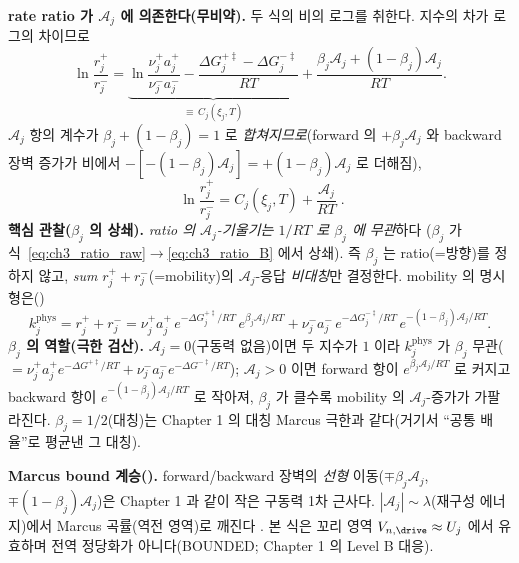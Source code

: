 \textbf{rate ratio 가 $\mathcal A_j$ 에 의존한다(무비약).} 두 식의 비의 로그를 취한다. 지수의 차가 로그의 차이므로
\begin{equation}
\ln\frac{r_j^+}{r_j^-}=\underbrace{\ln\frac{\nu_j^+a_j^+}{\nu_j^-a_j^-}-\frac{\Delta G_j^{+\ddagger}-\Delta G_j^{-\ddagger}}{RT}}_{\equiv\,C_j(\xi_j,T)}
+\frac{\beta_j\mathcal A_j+(1-\beta_j)\mathcal A_j}{RT}.
\label{eq:ch3_ratio_raw}
\end{equation}
$\mathcal A_j$ 항의 계수가 $\beta_j+(1-\beta_j)=1$ 로 \emph{합쳐지므로}(forward 의 $+\beta_j\mathcal A_j$ 와
backward 장벽 증가가 비에서 $-[-(1-\beta_j)\mathcal A_j]=+(1-\beta_j)\mathcal A_j$ 로 더해짐),
\begin{equation}
\boxed{\;\ln\frac{r_j^+}{r_j^-}=C_j(\xi_j,T)+\frac{\mathcal A_j}{RT}\;.}
\label{eq:ch3_ratio_B}
\end{equation}
\textbf{핵심 관찰($\beta_j$ 의 상쇄).} \emph{ratio 의 $\mathcal A_j$-기울기는 $1/RT$ 로 $\beta_j$ 에 무관}하다
($\beta_j$ 가 식~\eqref{eq:ch3_ratio_raw}$\to$\eqref{eq:ch3_ratio_B} 에서 상쇄). 즉 $\beta_j$ 는 ratio(=방향)를
정하지 않고, \emph{sum} $r_j^++r_j^-$(=mobility)의 $\mathcal A_j$-응답 \emph{비대칭}만 결정한다. mobility 의
명시형은()
\begin{equation}
k_j^{\mathrm{phys}}=r_j^++r_j^-
=\nu_j^+a_j^+\,e^{-\Delta G_j^{+\ddagger}/RT}\,e^{\beta_j\mathcal A_j/RT}
+\nu_j^-a_j^-\,e^{-\Delta G_j^{-\ddagger}/RT}\,e^{-(1-\beta_j)\mathcal A_j/RT}.
\label{eq:ch3_ksum}
\end{equation}
\textbf{$\beta_j$ 의 역할(극한 검산).} $\mathcal A_j=0$(구동력 없음)이면 두 지수가 $1$ 이라 $k_j^{\mathrm{phys}}$ 가
$\beta_j$ 무관($=\nu_j^+a_j^+e^{-\Delta G^{+\ddagger}/RT}+\nu_j^-a_j^-e^{-\Delta G^{-\ddagger}/RT}$); $\mathcal A_j>0$
이면 forward 항이 $e^{\beta_j\mathcal A_j/RT}$ 로 커지고 backward 항이 $e^{-(1-\beta_j)\mathcal A_j/RT}$ 로 작아져,
$\beta_j$ 가 클수록 mobility 의 $\mathcal A_j$-증가가 가팔라진다. $\beta_j=1/2$(대칭)는 Chapter 1 의 대칭 Marcus
극한과 같다(거기서 ``공통 배율''로 평균낸 그 대칭).
\begin{boundbox}
\textbf{Marcus bound 계승().} forward/backward 장벽의 \emph{선형} 이동($\mp\beta_j\mathcal A_j$,
$\mp(1-\beta_j)\mathcal A_j$)은 Chapter 1 과 같이 작은 구동력 1차 근사다. $|\mathcal A_j|\sim\lambda$(재구성
에너지)에서 Marcus 곡률(역전 영역)로 깨진다 \cite{marcus1956}. 본 식은 꼬리 영역 $V_{n,\drive}\approx U_j$ 에서
유효하며 전역 정당화가 아니다(BOUNDED; Chapter 1  의 Level B 대응).
\end{boundbox}

